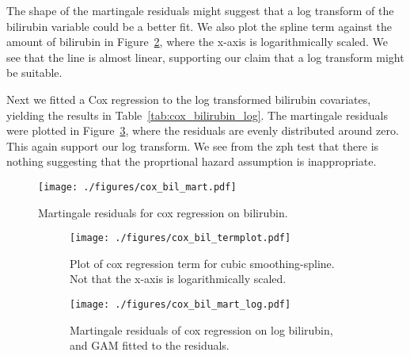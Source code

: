 \documentclass[11pt,a4paper]{article}
\begin{document}
The shape of the martingale residuals might suggest that a log transform of the bilirubin variable could be a better fit. We also plot the spline term against the amount of bilirubin in Figure~\ref{fig:cox_bil_termplot}, where the x-axis is logarithmically scaled. We see that the line is almost linear, supporting our claim that a log transform might be suitable.

Next we fitted a Cox regression to the log transformed bilirubin covariates, yielding the results in Table~\ref{tab:cox_bilirubin_log}.
The martingale residuals were plotted in Figure~\ref{fig:cox_bil_mart_log}, where the residuals are evenly distributed around zero. This again support our log transform.
We see from the zph test that there is nothing suggesting that the proprtional hazard assumption is inappropriate. 



\begin{figure}[h!tb]
    \begin{center}
        \texttt{[image: ./figures/cox\_bil\_mart.pdf]}
    \end{center}
    \vspace{-0.2cm}
    \caption{Martingale residuals for cox regression on bilirubin.}
    \label{fig:cox_bil_mart}
\end{figure}

\begin{figure}[h!tbp]
    \centering
    \begin{subfigure}[b]{0.48\textwidth}
        \texttt{[image: ./figures/cox\_bil\_termplot.pdf]}
        \caption{Plot of cox regression term for cubic smoothing-spline. Not that the x-axis is logarithmically scaled.}
        \label{fig:cox_bil_termplot}
    \end{subfigure}%
    \quad
    \begin{subfigure}[b]{0.48\textwidth}
        \texttt{[image: ./figures/cox\_bil\_mart\_log.pdf]}
        \caption{Martingale residuals of cox regression on log bilirubin, and GAM fitted to the residuals.}
        \label{fig:cox_bil_mart_log}
    \end{subfigure}
    \vspace{1\baselineskip}
    \caption{}
    \label{fig:cox_bil_term_and_mart}
\end{figure}


\end{document}
